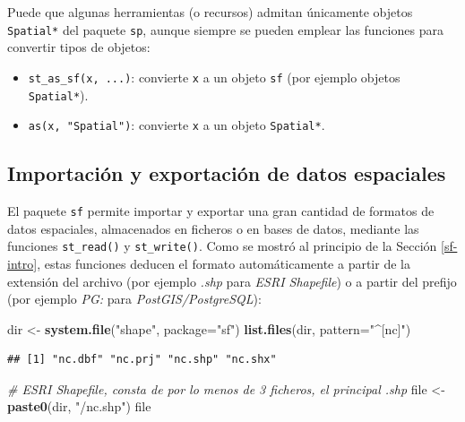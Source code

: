 \documentclass[
]{book}
\newenvironment{Shaded}{\begin{snugshade}}{\end{snugshade}}
\newcommand{\AttributeTok}[1]{\textcolor[rgb]{0.13,0.29,0.53}{#1}}
\newcommand{\CommentTok}[1]{\textcolor[rgb]{0.56,0.35,0.01}{\textit{#1}}}
\newcommand{\FunctionTok}[1]{\textcolor[rgb]{0.13,0.29,0.53}{\textbf{#1}}}
\newcommand{\NormalTok}[1]{#1}
\newcommand{\OtherTok}[1]{\textcolor[rgb]{0.56,0.35,0.01}{#1}}
\newcommand{\StringTok}[1]{\textcolor[rgb]{0.31,0.60,0.02}{#1}}
\providecommand{\tightlist}{%
  \setlength{\itemsep}{0pt}\setlength{\parskip}{0pt}}
\theoremstyle{break}
\theoremstyle{definition}
\theoremstyle{definition}
\theoremstyle{definition}
\theoremstyle{definition}
\theoremstyle{remark}
\begin{document}
Puede que algunas herramientas (o recursos) admitan únicamente objetos \texttt{Spatial*} del paquete \texttt{sp}, aunque siempre se pueden emplear las funciones para convertir tipos de objetos:

\begin{itemize}
\tightlist
\item
  \texttt{st\_as\_sf(x,\ ...)}: convierte \texttt{x} a un objeto \texttt{sf} (por ejemplo objetos \texttt{Spatial*}).
\item
  \texttt{as(x,\ "Spatial")}: convierte \texttt{x} a un objeto \texttt{Spatial*}.
\end{itemize}

\subsection{Importación y exportación de datos espaciales}\label{importaciuxf3n-y-exportaciuxf3n-de-datos-espaciales}

El paquete \texttt{sf} permite importar y exportar una gran cantidad de formatos de datos espaciales, almacenados en ficheros o en bases de datos, mediante las funciones \texttt{st\_read()} y \texttt{st\_write()}.
Como se mostró al principio de la Sección \ref{sf-intro}, estas funciones deducen el formato automáticamente a partir de la extensión del archivo (por ejemplo \emph{.shp} para \emph{ESRI Shapefile}) o a partir del prefijo (por ejemplo \emph{PG:} para \emph{PostGIS/PostgreSQL}):

\begin{Shaded}
\begin{Highlighting}[]
\NormalTok{dir }\OtherTok{\textless{}{-}} \FunctionTok{system.file}\NormalTok{(}\StringTok{"shape"}\NormalTok{, }\AttributeTok{package=}\StringTok{"sf"}\NormalTok{)}
\FunctionTok{list.files}\NormalTok{(dir, }\AttributeTok{pattern=}\StringTok{"\^{}[nc]"}\NormalTok{)}
\end{Highlighting}
\end{Shaded}

\begin{verbatim}
## [1] "nc.dbf" "nc.prj" "nc.shp" "nc.shx"
\end{verbatim}

\begin{Shaded}
\begin{Highlighting}[]
\CommentTok{\# ESRI Shapefile, consta de por lo menos de 3 ficheros, el principal .shp}
\NormalTok{file }\OtherTok{\textless{}{-}} \FunctionTok{paste0}\NormalTok{(dir, }\StringTok{"/nc.shp"}\NormalTok{)}
\NormalTok{file}
\end{Highlighting}
\end{Shaded}
\end{document}
